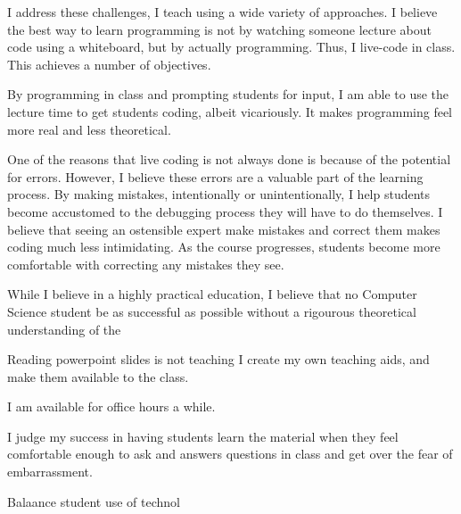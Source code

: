 \documentclass[10pt, a4paper]{article}
\begin{document}
I address these challenges, I teach using a wide variety of approaches.
I believe the best way to learn programming is not by watching someone lecture about code using a whiteboard, but by actually programming.
Thus, I live-code in class.
This achieves a number of objectives.

By programming in class and prompting students for input, I am able to use the lecture time to get students coding, albeit vicariously.
It makes programming feel more real and less theoretical.

One of the reasons that live coding is not always done is because of the potential for errors.
However, I believe these errors are a valuable part of the learning process.
By making mistakes, intentionally or unintentionally, I help students become accustomed to the debugging process they will have to do themselves.
I believe that seeing an ostensible expert make mistakes and correct them makes coding much less intimidating.
As the course progresses, students become more comfortable with correcting any mistakes they see.


While I believe in a highly practical education, I believe that no Computer Science student be as successful as possible without a rigourous theoretical understanding of the 


Reading powerpoint slides is not teaching 
I create my own teaching aids, and make them available to the class.



















I am available for office hours a while.


I judge my success in having students learn the material when they feel comfortable enough to ask and  answers questions in class and get over the fear of embarrassment.


Balaance student use of technol
\end{document}

